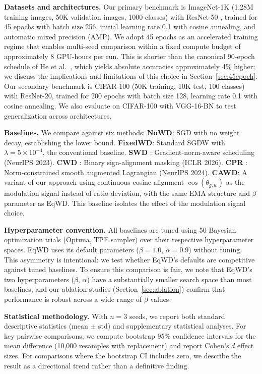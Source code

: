 \documentclass{article}
\begin{document}
\textbf{Datasets and architectures.} Our primary benchmark is
ImageNet-1K (1.28M training images, 50K validation images, 1000 classes)
with ResNet-50 \citep{he2016resnet}, trained for 45 epochs with batch
size 256, initial learning rate 0.1 with cosine annealing, and automatic
mixed precision (AMP). We adopt 45 epochs as an accelerated training
regime that enables multi-seed comparison within a fixed compute budget
of approximately 8 GPU-hours per run. This is shorter than the canonical
90-epoch schedule of He et al.~\citep{he2016resnet}, which yields
absolute accuracies approximately 4\% higher; we discuss the
implications and limitations of this choice in Section~\ref{sec:45epoch}. Our
secondary benchmark is CIFAR-100 (50K training, 10K test, 100 classes)
with ResNet-20, trained for 200 epochs with batch size 128, learning
rate 0.1 with cosine annealing. We also evaluate on CIFAR-100 with
VGG-16-BN \citep{simonyan2015vgg} to test generalization across
architectures.

\textbf{Baselines.} We compare against six methods:
\textbf{NoWD}: SGD with no weight decay, establishing the lower bound.
\textbf{FixedWD}: Standard SGDW with $\lambda = 5 \times 10^{-4}$, the conventional baseline.
\textbf{SWD} \citep{xie2023swd}: Gradient-norm-aware scheduling (NeurIPS 2023).
\textbf{CWD} \citep{chen2026cwd}: Binary sign-alignment masking (ICLR 2026).
\textbf{CPR} \citep{franke2024cpr}: Norm-constrained smooth augmented Lagrangian (NeurIPS 2024).
\textbf{CAWD}: A variant of our approach using continuous cosine alignment $\cos(\theta_{g,w})$ as the modulation signal instead of ratio deviation, with the same EMA structure and $\beta$ parameter as EqWD. This baseline isolates the effect of the modulation signal choice.

\textbf{Hyperparameter convention.} All baselines are tuned using 50
Bayesian optimization trials (Optuna, TPE sampler) over their respective
hyperparameter spaces. EqWD uses its default parameters
($\beta = 1.0$, $\alpha = 0.9$) without tuning. This asymmetry is
intentional: we test whether EqWD's defaults are competitive against
tuned baselines. To ensure this comparison is fair, we note that EqWD's
two hyperparameters ($\beta$, $\alpha$) have a substantially smaller
search space than most baselines, and our ablation studies (Section~\ref{sec:ablation})
confirm that performance is robust across a wide range of $\beta$
values.

\textbf{Statistical methodology.} With $n = 3$ seeds, we report both
standard descriptive statistics (mean $\pm$ std) and supplementary
statistical analyses. For key pairwise comparisons, we compute bootstrap
95\% confidence intervals for the mean difference (10,000 resamples with
replacement) and report Cohen's $d$ effect sizes. For comparisons
where the bootstrap CI includes zero, we describe the result as a
directional trend rather than a definitive finding.
\end{document}
